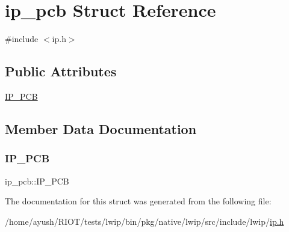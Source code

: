 \hypertarget{structip__pcb}{}\section{ip\+\_\+pcb Struct Reference}
\label{structip__pcb}


{\ttfamily \#include $<$ip.\+h$>$}

\subsection*{Public Attributes}
\begin{DoxyCompactItemize}
\item 
\hyperlink{structip__pcb_aa8c53363aec905c3556c4ce197e24fc3}{I\+P\+\_\+\+P\+CB}
\end{DoxyCompactItemize}


\subsection{Member Data Documentation}
\mbox{\label{structip__pcb_aa8c53363aec905c3556c4ce197e24fc3}} 
\subsubsection{\texorpdfstring{I\+P\+\_\+\+P\+CB}{IP\_PCB}}
{\footnotesize\ttfamily ip\+\_\+pcb\+::\+I\+P\+\_\+\+P\+CB}



The documentation for this struct was generated from the following file\+:\begin{DoxyCompactItemize}
\item 
/home/ayush/\+R\+I\+O\+T/tests/lwip/bin/pkg/native/lwip/src/include/lwip/\hyperlink{native_2lwip_2src_2include_2lwip_2ip_8h}{ip.\+h}\end{DoxyCompactItemize}
